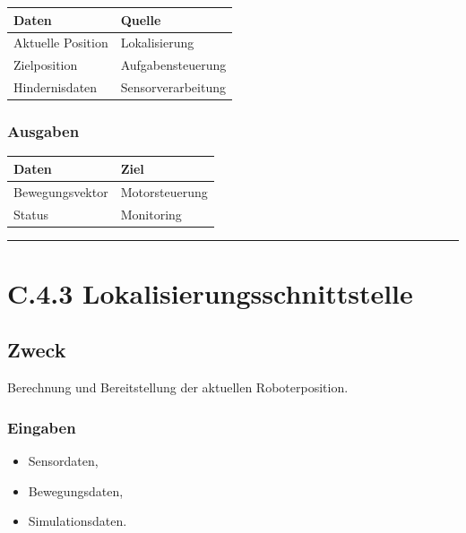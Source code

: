 \documentclass[
  a4paper,
  12pt,
  DIV=12,        %
  parskip=half,  %
  headings=small %
]{scrartcl}
\theoremstyle{definition}
\providecommand{\tightlist}{%
  \setlength{\itemsep}{0pt}\setlength{\parskip}{0pt}}
\theoremstyle{definition}
\providecommand{\tightlist}{%
  \setlength{\itemsep}{0pt}\setlength{\parskip}{0pt}}
\begin{document}
\begin{longtable}[]{@{}ll@{}}
\toprule\noalign{}
Daten & Quelle \\
\midrule\noalign{}
\endhead
\bottomrule\noalign{}
\endlastfoot
Aktuelle Position & Lokalisierung \\
Zielposition & Aufgabensteuerung \\
Hindernisdaten & Sensorverarbeitung \\
\end{longtable}

\subsubsection{Ausgaben}\label{ausgaben-1}

\begin{longtable}[]{@{}ll@{}}
\toprule\noalign{}
Daten & Ziel \\
\midrule\noalign{}
\endhead
\bottomrule\noalign{}
\endlastfoot
Bewegungsvektor & Motorsteuerung \\
Status & Monitoring \\
\end{longtable}

\begin{center}\rule{0.5\linewidth}{0.5pt}\end{center}

\section{C.4.3
Lokalisierungsschnittstelle}\label{c.4.3-lokalisierungsschnittstelle}

\subsection{Zweck}\label{zweck-7}

Berechnung und Bereitstellung der aktuellen Roboterposition.

\subsubsection{Eingaben}\label{eingaben-2}

\begin{itemize}
\tightlist
\item
  Sensordaten,
\item
  Bewegungsdaten,
\item
  Simulationsdaten.
\end{itemize}
\end{document}
